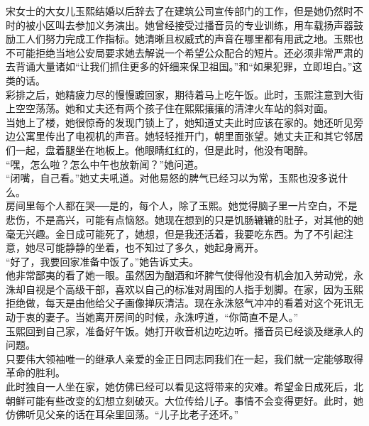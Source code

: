 宋女士的大女儿玉熙结婚以后辞去了在建筑公司宣传部门的工作，但是她仍然时不时的被小区叫去参加义务演出。她曾经接受过播音员的专业训练，用车载扬声器鼓励工人们努力完成工作指标。她清晰且权威式的声音在哪里都有用武之地。玉熙也不可能拒绝当地公安局要求她去解说一个希望公众配合的短片。还必须非常严肃的去背诵大量诸如“让我们抓住更多的奸细来保卫祖国。”和“如果犯罪，立即坦白。”这类的话。\\

彩排之后，她精疲力尽的慢慢踱回家，期待着马上吃午饭。此时，玉熙注意到大街上空空荡荡。她和丈夫还有两个孩子住在熙熙攘攘的清津火车站的斜对面。\\

当她上了楼，她很惊奇的发现门锁上了，她知道丈夫此时应该在家的。她还听见旁边公寓里传出了电视机的声音。她轻轻推开门，朝里面张望。她丈夫正和其它邻居们一起，盘着腿坐在地板上。他眼睛红红的，但是此时，他没有喝醉。\\

“嘿，怎么啦？怎么中午也放新闻？”她问道。\\

“闭嘴，自己看。”她丈夫吼道。对他易怒的脾气已经习以为常，玉熙也没多说什么。\\

房间里每个人都在哭──是的，每个人，除了玉熙。她觉得脑子里一片空白，不是悲伤，不是高兴，可能有点恼怒。她现在想到的只是饥肠辘辘的肚子，对其他的她毫无兴趣。金日成可能死了，她想，但是我还活着，我要吃东西。为了不引起注意，她尽可能静静的坐着，也不知过了多久，她起身离开。\\

“好了，我要回家准备中饭了。”她告诉丈夫。\\

他非常鄙夷的看了她一眼。虽然因为酗酒和坏脾气使得他没有机会加入劳动党，永洙却自视是个高级干部，喜欢以自己的标准对周围的人指手划脚。在家，因为玉熙拒绝做，每天是由他给父子画像掸灰清洁。现在永洙怒气冲冲的看着对这个死讯无动于衷的妻子。当她离开房间的时候，永洙哼道，“你简直不是人。”\\

玉熙回到自己家，准备好午饭。她打开收音机边吃边听。播音员已经谈及继承人的问题。\\

只要伟大领袖唯一的继承人亲爱的金正日同志同我们在一起，我们就一定能够取得革命的胜利。\\

此时独自一人坐在家，她仿佛已经可以看见这将带来的灾难。希望金日成死后，北朝鲜可能有些改变的幻想立刻破灭。大位传给儿子。事情不会变得更好。此时，她仿佛听见父亲的话在耳朵里回荡。“儿子比老子还坏。”\\

